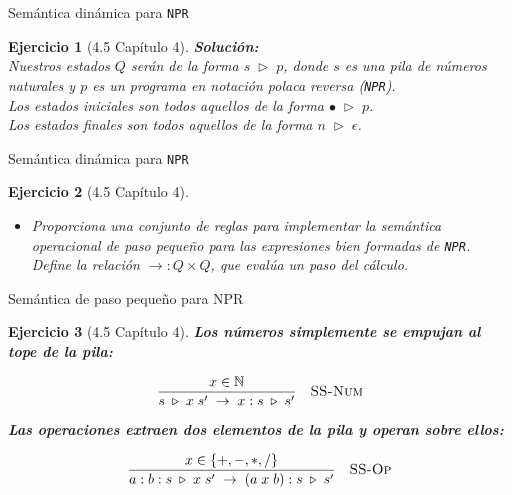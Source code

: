\documentclass[11pt]{beamer}
\newtheorem{exercise}{Ejercicio}
\begin{document}
\begin{frame}{Semántica dinámica para  \texttt{NPR}}
	\begin{exercise}[4.5 Capítulo 4]
		
	\textbf{Solución:} \\[1em]
	Nuestros estados $Q$ serán de la forma $s \; \triangleright \; p$, donde $s$ es una pila de números naturales y $p$ es un programa en notación polaca reversa (\texttt{NPR}). \\[1em]
	
	Los estados iniciales son todos aquellos de la forma $\bullet \; \triangleright \; p$. \\[1em]
	
	Los estados finales son todos aquellos de la forma $n \; \triangleright \; \epsilon$. \\[1em]
		
	\end{exercise}
\end{frame}


\begin{frame}{Semántica dinámica para  \texttt{NPR}}
	\begin{exercise}[4.5 Capítulo 4]
		\begin{itemize}
			\item Proporciona una conjunto de reglas para implementar la semántica operacional de paso pequeño para las expresiones bien formadas de \texttt{NPR}. Define la relación $\rightarrow : Q \times Q$, que evalúa un paso del cálculo.
		\end{itemize}
	\end{exercise}	
\end{frame}

\begin{frame}{Semántica de paso pequeño para NPR}
	
	\vspace{0.4cm}
	
	\begin{exercise}[4.5 Capítulo 4]
		
		\textbf{Los números simplemente se empujan al tope de la pila:}
		
		\[
		\frac{x \in \mathbb{N}}
		{s \;\triangleright\; x \; s' \;\rightarrow\; x : s \;\triangleright\; s'}
		\quad \textsc{SS-Num}
		\]
		
		\vspace{0.4cm}
		
		\textbf{Las operaciones extraen dos elementos de la pila y operan sobre ellos:}
		
		\[
		\frac{x \in \{+,-,\ast,/\}}
		{a : b : s \;\triangleright\; x \; s' \;\rightarrow\; (a \; x \; b) : s \;\triangleright\; s'}
		\quad \textsc{SS-Op}
		\]
		
	\end{exercise}
	
\end{frame}
\end{document}
